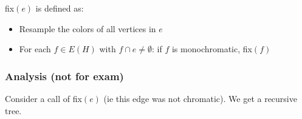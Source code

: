 \documentclass[11pt]{book}
\begin{document}
fix$(e)$ is defined as:
\begin{itemize}
	\item Resample the colors of all vertices in $e$
	\item For each $f \in E(H)$ with $f \cap e \neq \emptyset$: if $f$ is monochromatic, fix$(f)$
\end{itemize}


\subsubsection{Analysis (not for exam)}
Consider a call of fix$(e)$ (ie this edge was not chromatic). We get a recursive tree.
\end{document}
